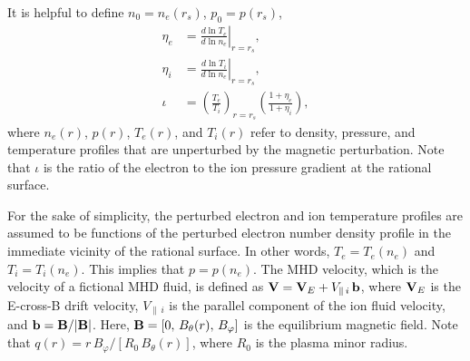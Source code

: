 \documentclass[12pt,prb,aps,notitlepage]{revtex4-1}
\begin{document}
It is helpful to define $n_0 = n_e(r_s)$, $p_0= p(r_s)$,
\begin{align}
\eta_e &=\left.\frac{d\ln T_e}{d\ln n_e}\right|_{r=r_s},\label{e211}\\[0.5ex]
\eta_i &= \left.\frac{d\ln T_i}{d\ln n_e}\right|_{r=r_s},\\[0.5ex]
\iota &= \left(\frac{T_e}{T_i}\right)_{r=r_s}\left(\frac{1+\eta_e}{1+\eta_i}\right),\label{e213}
\end{align}
where $n_e(r)$, $p(r)$, $T_e(r)$, and $T_i(r)$ refer to
density, pressure, and temperature profiles that are unperturbed by the magnetic perturbation. Note that $\iota$ is the ratio of the
electron to the ion pressure gradient at the rational surface.

For the sake of simplicity, the perturbed electron and ion temperature profiles are assumed to be functions of
the perturbed electron number density profile in the immediate vicinity of the rational surface. In other words, $T_e=T_e(n_e)$ and $T_i=T_i(n_e)$. This
implies that $p=p(n_e)$. 
The  MHD velocity, which is the velocity of a
fictional MHD fluid, is defined as ${\bf V}={\bf V}_E + V_{\parallel\,i}\,{\bf b}$, where ${\bf V}_E$ is the
E-cross-B drift velocity, $V_{\parallel\,i}$ is the parallel component of the ion fluid
velocity, and ${\bf b}= {\bf B}/|{\bf B}|$. Here, ${\bf B}= [0,\, B_\theta(r),\,B_\varphi]$ is the equilibrium magnetic field. Note
that $q(r)=r\,B_\varphi/[R_0\,B_\theta(r)]$, where $R_0$ is the plasma minor radius. 
\end{document}

